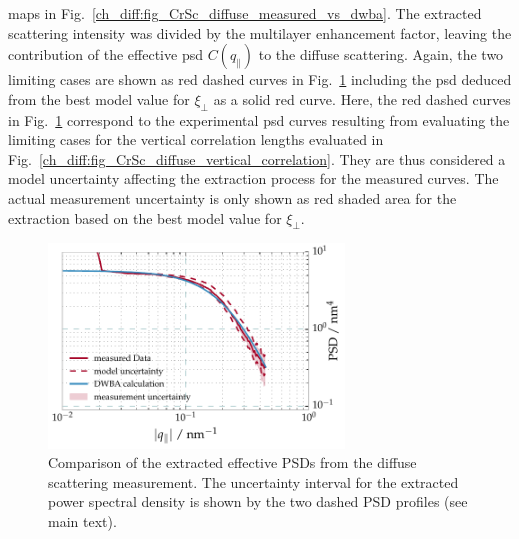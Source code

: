 maps in Fig.~\ref{ch_diff:fig_CrSc_diffuse_measured_vs_dwba}. The extracted scattering intensity was divided by the multilayer 
enhancement factor, leaving the contribution of the effective \gls{psd} $C(q_\parallel)$ to the diffuse scattering. Again, the two limiting cases are shown as red dashed curves in 
Fig.~\ref{ch_diff:fig_CrSc_diffuse_PSD} including the \gls{psd} deduced from the best model 
value for $\xi_\perp$ as a solid red curve. Here, the red dashed curves in Fig.~\ref{ch_diff:fig_CrSc_diffuse_PSD} correspond to the experimental \gls{psd} curves resulting from evaluating the limiting cases for the vertical correlation lengths evaluated in Fig.~\ref{ch_diff:fig_CrSc_diffuse_vertical_correlation}. They are thus considered a model uncertainty affecting the extraction process for the measured curves. The actual measurement uncertainty is only shown as red shaded area for the extraction based on the best model value for $\xi_\perp$.
\begin{figure}[htbp]
  \centering
  \includegraphics[width=0.7\textwidth]{img/CrSc_diffuse_PSD}
  \caption[Comparison of the extracted effective PSDs.]{Comparison of the extracted effective PSDs from the diffuse 
scattering measurement. The 
uncertainty interval for the extracted power spectral density is shown by the 
two dashed PSD profiles (see main text).}
  \label{ch_diff:fig_CrSc_diffuse_PSD}
\end{figure}

